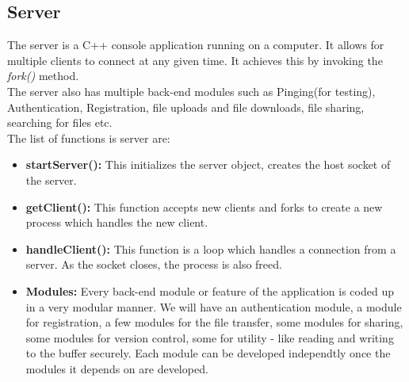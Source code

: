 \documentclass[]{article}
\begin{document}
\subsection{Server}
The server is a C++ console application running on a computer. It allows for multiple clients to connect at any given time. It achieves this by invoking the \textit{fork()} method. \\
The server also has multiple back-end modules such as Pinging(for testing), Authentication, Registration, file uploads and file downloads, file sharing, searching for files etc. \\
The list of functions is server are:
\begin{itemize}
\item \textbf{startServer():}  This initializes the server object, creates the host socket of the server. 
\item \textbf{getClient():}    This function accepts new clients and forks to create a new process which handles the new client.
\item \textbf{handleClient():} This function is a loop which handles a connection from a server. As the socket closes, the process is also freed.
\item \textbf{Modules:}
Every back-end module or feature of the application is coded up in a very modular manner. We will have an authentication module, a module for registration, a few modules for the file transfer, some modules for sharing, some modules for version control, some for utility - like reading and writing to the buffer securely. Each module can be developed independtly once the modules it depends on are developed.
\end{itemize}
\end{document}
